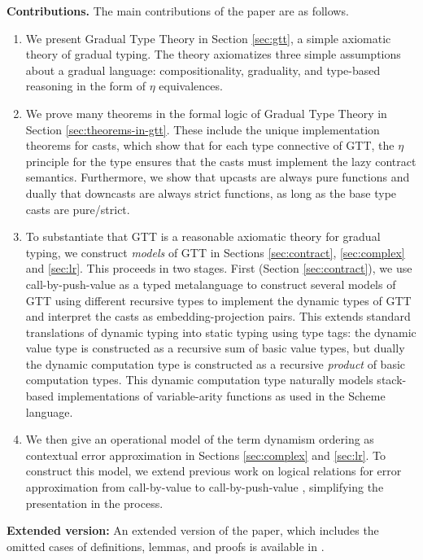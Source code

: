 \documentclass[acmsmall,nonacm]{acmart}
\begin{document}
\textbf{Contributions.}
The main contributions of the paper are as follows.
\begin{enumerate}
\item We present Gradual Type Theory in Section \ref{sec:gtt}, a simple
  axiomatic theory of gradual typing. The theory axiomatizes three
  simple assumptions about a gradual language: compositionality,
  graduality, and type-based reasoning in the form of $\eta$
  equivalences.
\item We prove many theorems in the formal logic of Gradual Type
  Theory in Section \ref{sec:theorems-in-gtt}. These include the
  unique implementation theorems for casts, which show that for
  each type connective of GTT, the $\eta$ principle for the type
  ensures that the casts must implement the lazy contract
  semantics. Furthermore, we show that upcasts are always pure
  functions and dually that downcasts are always strict functions, as
  long as the base type casts are pure/strict.
\item To substantiate that GTT is a reasonable axiomatic theory for
  gradual typing, we construct \emph{models} of GTT in Sections
  \ref{sec:contract}, \ref{sec:complex} and \ref{sec:lr}.  This proceeds
  in two stages. First (Section \ref{sec:contract}), we use
  call-by-push-value as a typed metalanguage to construct several models
  of GTT using different recursive types to implement the dynamic types
  of GTT and interpret the casts as embedding-projection pairs. This
  extends standard translations of dynamic typing into static typing
  using type tags: the dynamic value type is constructed as a recursive
  sum of basic value types, but dually the dynamic computation type is
  constructed as a recursive \emph{product} of basic computation
  types. This dynamic computation type naturally models stack-based
  implementations of variable-arity functions as used in the Scheme
  language.
\item We then give an operational model of the term dynamism ordering
  as contextual error approximation in Sections \ref{sec:complex} and
  \ref{sec:lr}. To construct this model, we extend previous work on
  logical relations for error approximation from call-by-value to
  call-by-push-value \cite{newahmed18}, simplifying the presentation
  in the process.
\end{enumerate}

\begin{shortonly}
\textbf{Extended version:} An extended version of the paper, which
includes the omitted cases of definitions, lemmas, and proofs is
available in \citet{newlicataahmed19:extended}.
\end{shortonly}
\end{document}
